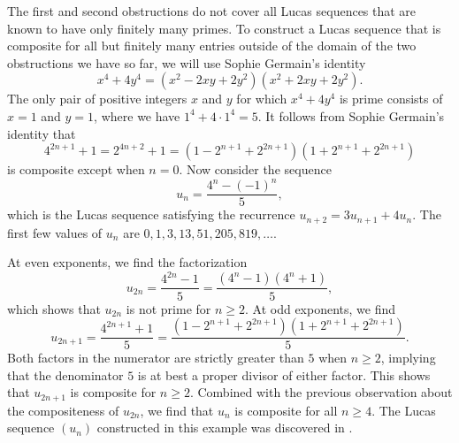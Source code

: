 \begin{example}
  The first and second obstructions do not cover all Lucas sequences that are known to have only finitely many primes. To construct a Lucas sequence that is composite for all but finitely many entries outside of the domain of the two obstructions we have so far, we will use Sophie Germain's identity
  \begin{equation*}
    x^4+4y^4=(x^2-2xy+2y^2)(x^2+2xy+2y^2).
  \end{equation*}
  The only pair of positive integers $x$ and $y$ for which $x^4+4y^4$ is prime consists of $x=1$ and $y=1$, where we have $1^4+4\cdot 1^4=5$. It follows from Sophie Germain's identity that
  \begin{equation*}
    4^{2n+1}+1=2^{4n+2}+1=(1-2^{n+1}+2^{2n+1})(1+2^{n+1}+2^{2n+1})
  \end{equation*}
  is composite except when $n=0$. Now consider the sequence
  \begin{equation*}
    u_n=\frac{4^n-(-1)^n}{5},
  \end{equation*}
  which is the Lucas sequence satisfying the recurrence $u_{n+2}=3u_{n+1}+4u_n$. The first few values of $u_n$ are $0,1,3,13,51,205,819,\ldots$.

  At even exponents, we find the factorization
  \begin{equation*}
    u_{2n}=\frac{4^{2n}-1}{5}=\frac{(4^n-1)(4^n+1)}{5},
  \end{equation*}
  which shows that $u_{2n}$ is not prime for $n\geq 2$. At odd exponents, we find
  \begin{equation*}
    u_{2n+1}=\frac{4^{2n+1}+1}{5}=\frac{(1-2^{n+1}+2^{2n+1})(1+2^{n+1}+2^{2n+1})}{5}.
  \end{equation*}
  Both factors in the numerator are strictly greater than $5$ when $n\geq 2$, implying that the denominator $5$ is at best a proper divisor of either factor. This shows that $u_{2n+1}$ is composite for $n\geq 2$. Combined with the previous observation about the compositeness of $u_{2n}$, we find that $u_n$ is composite for all $n\geq 4$. The Lucas sequence $(u_n)$ constructed in this example was discovered in \cite{IJKKL2025}.
\end{example}

